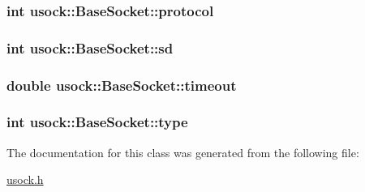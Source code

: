 \hypertarget{classusock_1_1BaseSocket_91b9f72f183b6314891f7e1f93ead99a}{
\subsubsection[{protocol}]{\setlength{\rightskip}{0pt plus 5cm}int {\bf usock::BaseSocket::protocol}}}
\label{classusock_1_1BaseSocket_91b9f72f183b6314891f7e1f93ead99a}


\hypertarget{classusock_1_1BaseSocket_63b6c07fb14f937056148cbf8b3531c5}{
\subsubsection[{sd}]{\setlength{\rightskip}{0pt plus 5cm}int {\bf usock::BaseSocket::sd}}}
\label{classusock_1_1BaseSocket_63b6c07fb14f937056148cbf8b3531c5}


\hypertarget{classusock_1_1BaseSocket_b419e8fd0b849c74b73a02d6bd9081e3}{
\subsubsection[{timeout}]{\setlength{\rightskip}{0pt plus 5cm}double {\bf usock::BaseSocket::timeout}}}
\label{classusock_1_1BaseSocket_b419e8fd0b849c74b73a02d6bd9081e3}


\hypertarget{classusock_1_1BaseSocket_139a74d163977332762f349a73f4bd64}{
\subsubsection[{type}]{\setlength{\rightskip}{0pt plus 5cm}int {\bf usock::BaseSocket::type}}}
\label{classusock_1_1BaseSocket_139a74d163977332762f349a73f4bd64}




The documentation for this class was generated from the following file:\begin{CompactItemize}
\item 
\hyperlink{usock_8h}{usock.h}\end{CompactItemize}
